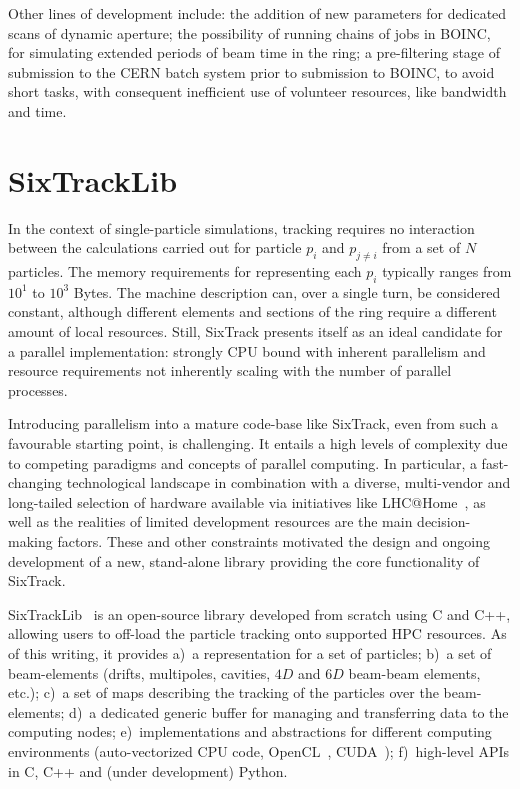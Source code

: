 \documentclass[a4paper,
              ]{jacow}
\begin{document}
Other lines of development include: the addition of new parameters for dedicated scans of dynamic aperture; the possibility of running chains of jobs in BOINC, for simulating extended periods of beam time in the ring; a pre-filtering stage of submission to the CERN batch system prior to submission to BOINC, to avoid short tasks, with consequent inefficient use of volunteer resources, like bandwidth and time.

\section{SixTrackLib}

In the context of single-particle simulations, tracking requires no interaction between the calculations carried out for particle $p_i$ and $p_{j\neq i}$ from a set of $N$ particles. The memory requirements for representing each $p_i$ typically ranges from $10^1$ to $10^3$ Bytes. The machine description can, over a single turn, be considered constant, although different elements and sections of the ring require a different amount of local resources. Still, SixTrack presents itself as an ideal candidate for a parallel implementation: strongly CPU bound with inherent parallelism and resource requirements not inherently scaling with the number of parallel processes. 

Introducing parallelism into a mature code-base like SixTrack, even from such a favourable starting point, is challenging. It entails a high levels of complexity due to competing paradigms and concepts of parallel computing. In particular, a fast-changing technological landscape in combination with a diverse, multi-vendor and long-tailed selection of hardware available via initiatives like LHC@Home~\cite{lhcathome}, as well as the realities of limited development resources are the main decision-making factors. These and other constraints motivated the design and ongoing development of a new, stand-alone library providing the core functionality of SixTrack.

SixTrackLib~\cite{sixtracklib} is an open-source library developed from scratch using C and C++, allowing users to off-load the particle tracking onto supported HPC resources. As of this writing, it provides
a)~a representation for a set of particles; b)~a set of beam-elements (drifts, multipoles, cavities, $4D$ and $6D$ beam-beam elements, etc.); c)~a set of maps describing the tracking of the particles over the beam-elements; d)~a dedicated generic buffer for managing and transferring data to the computing nodes; e)~implementations and abstractions for different computing environments (auto-vectorized CPU code, OpenCL~\cite{opencl}, CUDA~\cite{cuda}); f)~high-level APIs in C, C++ and (under development) Python.
\end{document}
